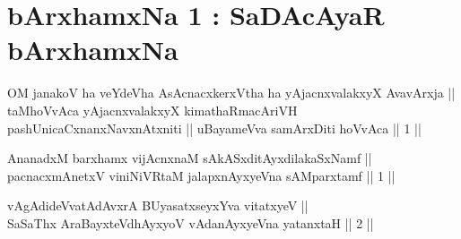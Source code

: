 


\chapter{bArxhamxNa 1 : SaDAcAyaR bArxhamxNa}


\begin{kandikeshl}
OM janakoV ha veYdeVha AsAcnacxkerxV\s tha ha yAjacnxvalakxyX AvavArxja || taMhoVvAca yAjacnxvalakxyX kimathaRmacAriVH pashUnicaCxnanxNavxnAtxniti || uBayameVva samArxDiti hoVvAca || 1 ||
\end{kandikeshl}


\begin{shl}
AnanadxM barxhamx vijAcnxnaM sAkASxditAyxdilakaSxNamf || \\
pacnacxmAnetxV viniNiVRtaM jalapxnAyxyeVna sAMparxtamf \hfill || 1 ||  
\end{shl}
				
\begin{shl}
vAgAdideVvatAdAvxrA BUyasatxseyxYva vitatxyeV || \\
SaSaThx AraBayxteV\s dhAyxyoV vAdanAyxyeVna yatanxtaH \hfill ||  2 ||  
\end{shl}

